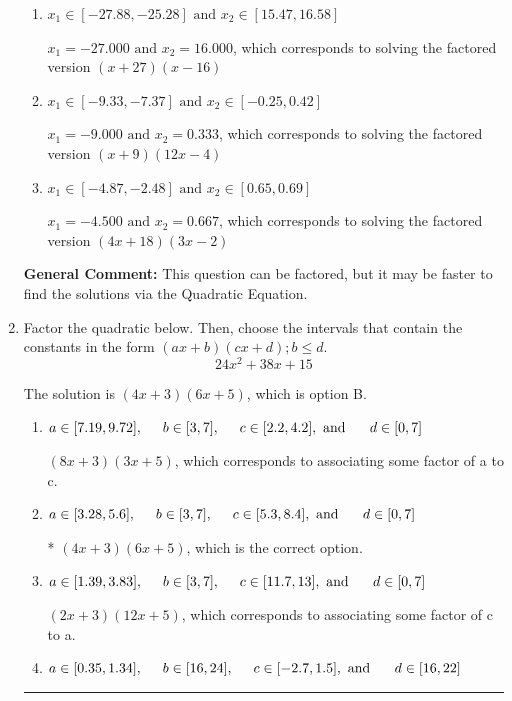 \documentclass{extbook}[14pt]
\newcommand{\litem}[1]{\item #1

\rule{\textwidth}{0.4pt}}
\begin{document}
\begin{enumerate}
{\begin{enumerate}[label=\Alph*.]
* $x_1 = -2.250 \text{ and } x_2 = 1.333$, which is the correct option. Obtained by solving the factored version $(4x + 9)(3x -4)$
\item \( x_1 \in [-27.88, -25.28] \text{ and } x_2 \in [15.47, 16.58] \)

$x_1 = -27.000 \text{ and } x_2 = 16.000$, which corresponds to solving the factored version $(x + 27)(x -16)$
\item \( x_1 \in [-9.33, -7.37] \text{ and } x_2 \in [-0.25, 0.42] \)

$x_1 = -9.000 \text{ and } x_2 = 0.333$, which corresponds to solving the factored version $(x + 9)(12x -4)$
\item \( x_1 \in [-4.87, -2.48] \text{ and } x_2 \in [0.65, 0.69] \)

$x_1 = -4.500 \text{ and } x_2 = 0.667$, which corresponds to solving the factored version $(4x + 18)(3x -2)$
\end{enumerate}

\textbf{General Comment:} This question can be factored, but it may be faster to find the solutions via the Quadratic Equation.
}
\litem{
Factor the quadratic below. Then, choose the intervals that contain the constants in the form $(ax+b)(cx+d); b \leq d.$
\[ 24x^{2} +38 x + 15 \]

The solution is \( (4x + 3)(6x + 5) \), which is option B.\begin{enumerate}[label=\Alph*.]
\item \( a \in [7.19, 9.72], \hspace*{5mm} b \in [3, 7], \hspace*{5mm} c \in [2.2, 4.2], \text{ and } \hspace*{5mm} d \in [0, 7] \)

 $(8x + 3)(3x + 5)$, which corresponds to associating some factor of a to c.
\item \( a \in [3.28, 5.6], \hspace*{5mm} b \in [3, 7], \hspace*{5mm} c \in [5.3, 8.4], \text{ and } \hspace*{5mm} d \in [0, 7] \)

* $(4x + 3)(6x + 5)$, which is the correct option.
\item \( a \in [1.39, 3.83], \hspace*{5mm} b \in [3, 7], \hspace*{5mm} c \in [11.7, 13], \text{ and } \hspace*{5mm} d \in [0, 7] \)

 $(2x + 3)(12x + 5)$, which corresponds to associating some factor of c to a.
\item \( a \in [0.35, 1.34], \hspace*{5mm} b \in [16, 24], \hspace*{5mm} c \in [-2.7, 1.5], \text{ and } \hspace*{5mm} d \in [16, 22] \)


\end{enumerate}}
\end{enumerate}
\end{document}
